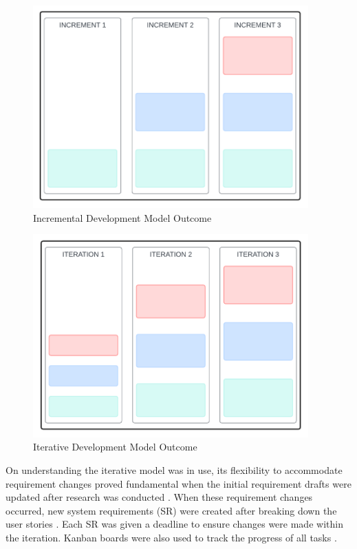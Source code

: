 \begin{figure}
    \centering
    \includegraphics[width=400px]{figures/incremental-result.pdf}
    \caption{Incremental Development Model Outcome}
    \label{fig:incremental-result}
\end{figure}

\begin{figure}
    \centering
    \includegraphics[width=400px]{figures/iterative-result.pdf}
    \caption{Iterative Development Model Outcome}
    \label{fig:iterative-result}
\end{figure}

On understanding the iterative model was in use, its flexibility to accommodate requirement changes proved fundamental when the initial requirement drafts were updated after research was conducted . When these requirement changes occurred, new system requirements (SR) were created after breaking down the user stories . Each SR was given a deadline to ensure changes were made within the iteration. Kanban boards were also used to track the progress of all tasks .


